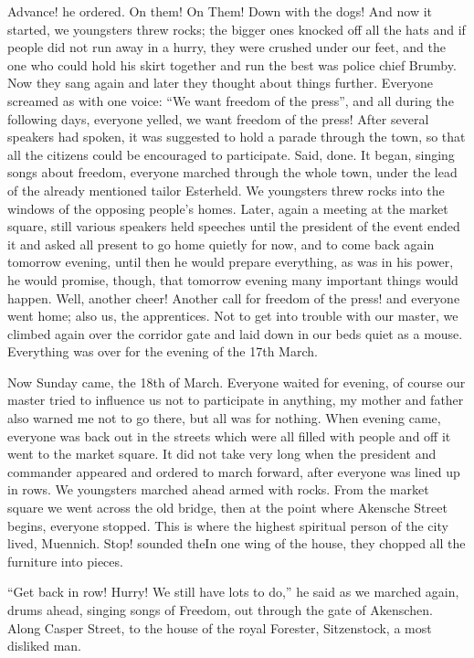 Advance! he ordered. On them! On Them! Down with the dogs! And now it started, we youngsters threw rocks; the bigger ones knocked off all the hats and if people did not run away in a hurry, they were crushed under our feet, and the one who could hold his skirt together and run the best was police chief Brumby. Now they sang again and later they thought about things further. Everyone screamed as with one voice: ``We want freedom of the press'', and all during the following days, everyone yelled, we want freedom of the press! After several speakers had spoken, it was suggested to hold a parade through the town, so that all the citizens could be encouraged to participate. Said, done. It began, singing songs about freedom, everyone marched through the whole town, under the lead of the already mentioned tailor Esterheld. We youngsters threw rocks into the windows of the opposing people's homes. Later, again a meeting at the market square, still various speakers held speeches until the president of the event ended it and asked all present to go home quietly for now, and to come back again tomorrow evening, until then he would prepare everything, as was in his power, he would promise, though, that tomorrow evening many important things would happen. Well, another cheer! Another call for freedom of the press! and everyone went home; also us, the apprentices. Not to get into trouble with our master, we climbed again over the corridor gate and laid down in our beds quiet as a mouse. Everything was over for the evening of the 17th March.

Now Sunday came, the 18th of March. Everyone waited for evening, of course our master tried to influence us not to participate in anything, my mother and father also warned me not to go there, but all was for nothing. When evening came, everyone was back out in the streets which were all filled with people and off it went to the market square. It did not take very long when the president and commander appeared and ordered to march forward, after everyone was lined up in rows. We youngsters marched ahead armed with rocks. From the market square we went across the old bridge, then at the point where Akensche Street begins, everyone stopped. This is where the highest spiritual person of the city lived, Muennich. Stop! sounded theIn one wing of the house, they chopped all the furniture into pieces.

``Get back in row! Hurry! We still have lots to do,'' he said as we marched again, drums ahead, singing songs of Freedom, out through the gate of Akenschen. Along Casper Street, to the house of the royal Forester, Sitzenstock, a most disliked man.

